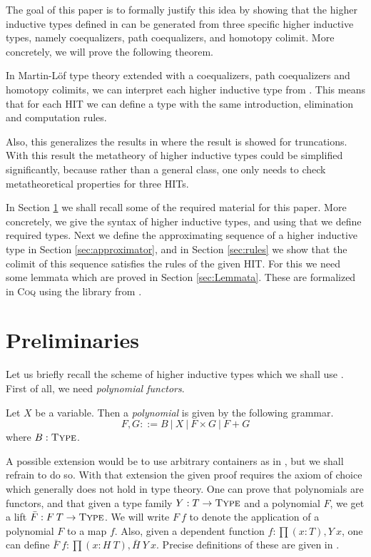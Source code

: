 \documentclass[a4paper,UKenglish]{lipics-v2016}
\newcommand{\Type}[0]{\operatorname{\textsc{Type}}}
\begin{document}
The goal of this paper is to formally justify this idea by showing that the higher inductive types defined in \cite{basoldhigher} can be generated from three specific higher inductive types, namely coequalizers, path coequalizers, and homotopy colimit.
More concretely, we will prove the following theorem.
\begin{theorem}
\label{thm:three-hit}
In Martin-L\"of type theory extended with a coequalizers, path coequalizers and homotopy colimits, we can interpret each higher inductive type from \cite{basoldhigher}. 
This means that for each HIT we can define a type with the same introduction, elimination and computation rules.
\end{theorem}
Also, this generalizes the results in \cite{doorn2016constructing,kraus2014general,kraus2016constructions} where the result is showed for truncations.
With this result the metatheory of higher inductive types could be simplified significantly, because rather than a general class, one only needs to check metatheoretical properties for three HITs.

In Section \ref{sec:prelims} we shall recall some of the required material for this paper.
More concretely, we give the syntax of higher inductive types, and using that we define required types.
Next we define the approximating sequence of a higher inductive type in Section \ref{sec:approximator}, and in Section \ref{sec:rules} we show that the colimit of this sequence satisfies the rules of the given HIT.
For this we need some lemmata which are proved in Section \ref{sec:Lemmata}.
These are formalized in \textsc{Coq} \cite{CoqImpl} using the library from \cite{bauer2016hott}.

\section{Preliminaries}
\label{sec:prelims}
Let us briefly recall the scheme of higher inductive types which we shall use \cite{basoldhigher}.
First of all, we need \emph{polynomial functors}.
\begin{definition}
Let $X$ be a variable.
Then a \emph{polynomial} is given by the following grammar.
\[
F, G ::= B \ | \ X \ | \ F \times G \ | \ F + G
\]
where $B : \Type$.
\end{definition}
A possible extension would be to use arbitrary containers as in \cite{abbott2005containers}, but we shall refrain to do so.
With that extension the given proof requires the axiom of choice which generally does not hold in type theory.
One can prove that polynomials are functors, and that given a type family $Y : T \rightarrow \Type$ and a polynomial $F$, we get a lift $\bar{F} : F \> T \rightarrow \Type$.
We will write $F \> f$ to denote the application of a polynomial $F$ to a map $f$.
Also, given a dependent function $f : \prod (x : T), Y \> x$, one can define $\bar{F} \> f : \prod (x : H \> T), \bar{H} \> Y \> x$.
Precise definitions of these are given in \cite{basoldhigher}.
\end{document}
